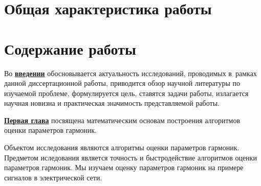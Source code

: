 \section*{Общая характеристика работы}

\newcommand{\actuality}{\underline{\textbf{\actualityTXT}}}
\newcommand{\progress}{\underline{\textbf{\progressTXT}}}
\newcommand{\aim}{\underline{{\textbf\aimTXT}}}
\newcommand{\tasks}{\underline{\textbf{\tasksTXT}}}
\newcommand{\novelty}{\underline{\textbf{\noveltyTXT}}}
\newcommand{\influence}{\underline{\textbf{\influenceTXT}}}
\newcommand{\methods}{\underline{\textbf{\methodsTXT}}}
\newcommand{\defpositions}{\underline{\textbf{\defpositionsTXT}}}
\newcommand{\reliability}{\underline{\textbf{\reliabilityTXT}}}
\newcommand{\probation}{\underline{\textbf{\probationTXT}}}
\newcommand{\contribution}{\underline{\textbf{\contributionTXT}}}
\newcommand{\publications}{\underline{\textbf{\publicationsTXT}}}




\section*{Содержание работы}
Во \underline{\textbf{введении}} обосновывается актуальность
исследований, проводимых в~рамках данной диссертационной работы,
приводится обзор научной литературы по изучаемой проблеме,
формулируется цель, ставятся задачи работы, излагается научная новизна
и практическая значимость представляемой работы. 

\underline{\textbf{Первая глава}} посвящена %
математическим основам построения алгоритмов оценки параметров гармоник.

Объектом исследования являются алгоритмы оценки параметров гармоник. Предметом иследования является точность и быстродействие алгоритмов оценки параметров гармоник. Мы изучаем оценку параметров гармоник на примере сигналов в электрической сети.

